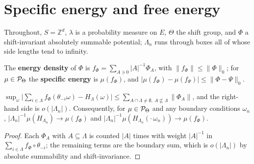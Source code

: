 \section{Specific energy and free energy}

Throughout, $S = \mathbb{Z}^d$, $\lambda$ is a probability measure on $E$, $\Theta$ the shift
group, and $\Phi$ a shift-invariant absolutely summable potential; $\Lambda_n$ runs through boxes
all of whose side lengths tend to infinity.

\begin{definition}
    \label{def:pr-energy-density}
    \leanok

    The \textbf{energy density} of $\Phi$ is $f_\Phi = \sum_{A \ni 0} |A|^{-1} \Phi_A$, with
    $\|f_\Phi\| \leq \|\Phi\|_0$; for $\mu \in \mathcal{P}_\Theta$ the \textbf{specific energy} is
    $\mu(f_\Phi)$, and $|\mu(f_\Phi) - \mu(f_\Psi)| \leq \|\Phi - \Psi\|_0$.
\end{definition}

\begin{proposition}[Georgii (15.23), (15.25)]
    \label{prop:pr-15-25}
    \leanok

    $\sup_\omega \bigl|\sum_{i \in \Lambda} f_\Phi(\theta_{-i}\omega) - H_\Lambda(\omega)\bigr|
    \leq \sum_{A \cap \Lambda \neq \emptyset,\ A \not\subseteq \Lambda} \|\Phi_A\|$, and the
    right-hand side is $o(|\Lambda_n|)$. Consequently, for $\mu \in \mathcal{P}_\Theta$ and any boundary
    conditions $\omega_n$, $|\Lambda_n|^{-1}\mu(H_{\Lambda_n}) \to \mu(f_\Phi)$ and
    $|\Lambda_n|^{-1}\mu(H_{\Lambda_n}(\cdot\,\omega_n)) \to \mu(f_\Phi)$.
\end{proposition}
\begin{proof}
    \leanok
    Each $\Phi_A$ with $A \subseteq \Lambda$ is counted $|A|$ times with weight $|A|^{-1}$ in
    $\sum_{i \in \Lambda} f_\Phi \circ \theta_{-i}$; the remaining terms are the boundary sum,
    which is $o(|\Lambda_n|)$ by absolute summability and shift-invariance.
\end{proof}


